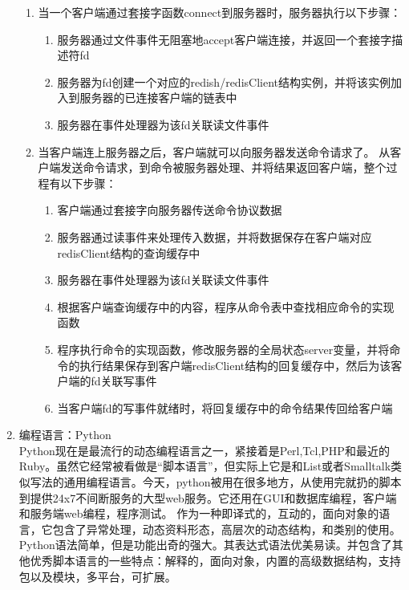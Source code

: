 \documentclass[proposal]{zjutreport}
\begin{document}
\begin{enumerate}[label=（\arabic*）]
{\begin{enumerate}[label=\arabic*.]
\item{当一个客户端通过套接字函数connect到服务器时，服务器执行以下步骤：
\begin{enumerate}[label=\Roman{*}.]
\item{服务器通过文件事件无阻塞地accept客户端连接，并返回一个套接字描述符fd}
\item{服务器为fd创建一个对应的redish/redisClient结构实例，并将该实例加入到服务器的已连接客户端的链表中}
\item{服务器在事件处理器为该fd关联读文件事件}
\end{enumerate}
}

\item{
当客户端连上服务器之后，客户端就可以向服务器发送命令请求了。
从客户端发送命令请求，到命令被服务器处理、并将结果返回客户端，整个过程有以下步骤：
\begin{enumerate}[label=\Roman{*}.]
\item{客户端通过套接字向服务器传送命令协议数据}
\item{服务器通过读事件来处理传入数据，并将数据保存在客户端对应redisClient结构的查询缓存中}
\item{服务器在事件处理器为该fd关联读文件事件}
\item{根据客户端查询缓存中的内容，程序从命令表中查找相应命令的实现函数}
\item{程序执行命令的实现函数，修改服务器的全局状态server变量，并将命令的执行结果保存到客户端redisClient结构的回复缓存中，然后为该客户端的fd关联写事件}
\item{当客户端fd的写事件就绪时，将回复缓存中的命令结果传回给客户端}
\end{enumerate}
}
\end{enumerate}
}
\item{编程语言：Python\\
Python现在是最流行的动态编程语言之一，紧接着是Perl,Tcl,PHP和最近的Ruby。虽然它经常被看做是“脚本语言”，但实际上它是和List或者Smalltalk类似写法的通用编程语言。今天，python被用在很多地方，从使用完就扔的脚本到提供24x7不间断服务的大型web服务。它还用在GUI和数据库编程，客户端和服务端web编程，程序测试。
作为一种即译式的，互动的，面向对象的语言，它包含了异常处理，动态资料形态，高层次的动态结构，和类别的使用。Python语法简单，但是功能出奇的强大。其表达式语法优美易读。并包含了其他优秀脚本语言的一些特点：解释的，面向对象，内置的高级数据结构，支持包以及模块，多平台，可扩展。
}
\end{enumerate}
\end{document}
